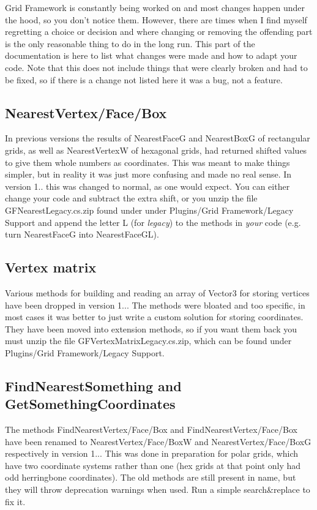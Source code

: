 Grid Framework is constantly being worked on and most changes happen under the hood, so you don't notice them. However, there are times when I find myself regretting a choice or decision and where changing or removing the offending part is the only reasonable thing to do in the long run. This part of the documentation is here to list what changes were made and how to adapt your code. Note that this does not include things that were clearly broken and had to be fixed, so if there is a change not listed here it was a bug, not a feature.

\subsection*{Nearest\+Vertex/\+Face/\+Box }

In previous versions the results of {\ttfamily Nearest\+Face\+G} and {\ttfamily Nearest\+Box\+G} of rectangular grids, as well as {\ttfamily Nearest\+Vertex\+W} of hexagonal grids, had returned shifted values to give them whole numbers as coordinates. This was meant to make things simpler, but in reality it was just more confusing and made no real sense. In version 1.. this was changed to normal, as one would expect. You can either change your code and subtract the extra shift, or you unzip the file G\+F\+Nearest\+Legacy.\+cs.\+zip found under under Plugins/\+Grid Framework/\+Legacy Support and append the letter L (for {\itshape legacy}) to the methods in {\itshape your} code (e.\+g. turn {\ttfamily Nearest\+Face\+G} into {\ttfamily Nearest\+Face\+G\+L}).

\subsection*{Vertex matrix }

Various methods for building and reading an array of Vector3 for storing vertices have been dropped in version 1... The methods were bloated and too specific, in most cases it was better to just write a custom solution for storing coordinates. They have been moved into extension methods, so if you want them back you must unzip the file G\+F\+Vertex\+Matrix\+Legacy.\+cs.\+zip, which can be found under Plugins/\+Grid Framework/\+Legacy Support.

\subsection*{Find\+Nearest\+Something and Get\+Something\+Coordinates }

The methods {\ttfamily Find\+Nearest\+Vertex/\+Face/\+Box} and {\ttfamily Find\+Nearest\+Vertex/\+Face/\+Box} have been renamed to {\ttfamily Nearest\+Vertex/\+Face/\+Box\+W} and {\ttfamily Nearest\+Vertex/\+Face/\+Box\+G} respectively in version 1... This was done in preparation for polar grids, which have two coordinate systems rather than one (hex grids at that point only had odd herringbone coordinates). The old methods are still present in name, but they will throw deprecation warnings when used. Run a simple search\&replace to fix it. 